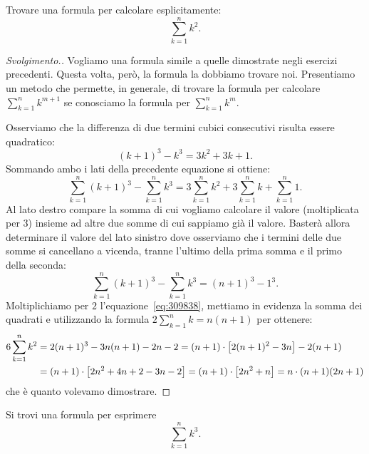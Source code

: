 \begin{exercise}
  Trovare una formula per calcolare esplicitamente:
  \[
    \sum_{k=1}^n k^2.
  \]
\end{exercise}
\begin{proof}[Svolgimento.]
Vogliamo una formula simile a quelle dimostrate negli esercizi 
precedenti. 
Questa volta, però, la formula la dobbiamo trovare noi.
Presentiamo un metodo che permette, in generale, 
di trovare la formula per calcolare $\sum_{k=1}^n k^{m+1}$
se conosciamo la formula per $\sum_{k=1}^n k^m$.

Osserviamo che la differenza 
di due termini cubici consecutivi risulta essere quadratico:
\[
(k+1)^3 - k^3 = 3 k^2 + 3k + 1.  
\]
Sommando ambo i lati della precedente equazione si ottiene:
\begin{equation}\label{eq:309838}
\sum_{k=1}^n (k+1)^3 - \sum_{k=1}^n k^3 
= 3\sum_{k=1}^n k^2+3\sum_{k=1}^n k+\sum_{k=1}^n 1.
\end{equation}
Al lato destro compare la somma di cui vogliamo calcolare il valore 
(moltiplicata per $3$)
insieme ad altre due somme di cui sappiamo già il valore. 
Basterà allora determinare il valore del lato sinistro dove 
osserviamo che i termini delle due somme si cancellano 
a vicenda,
tranne l'ultimo della prima somma 
e il primo della seconda: 
\[
  \sum_{k=1}^n(k+1)^3 - \sum_{k=1}^n k^3 = (n+1)^3 - 1^3.
\]
Moltiplichiamo per $2$ l'equazione~\eqref{eq:309838},
mettiamo in evidenza la somma dei quadrati e 
utilizzando la formula $2\sum_{k=1}^n k = n(n+1)$
per ottenere:
\begin{align*}
  6 \sum_{k=1}^n k^2 
  &=  2(n+1)^3 - 3 n(n+1) - 2n - 2
  = (n+1) \cdot {\left[ 2(n+1)^2 - 3n \right]} - 2(n+1)\\
  &= (n+1)\cdot {\left[ 2n^2+4n+2 -3n - 2 \right]}
   = (n+1)\cdot {\left[ 2n^2+n \right]} 
   = n \cdot (n+1)(2n+1)
\end{align*}
che è quanto volevamo dimostrare.
\end{proof}

\begin{exercise}
  Si trovi una formula per esprimere
  \[
  \sum_{k=1}^n k^3.
  \]
\end{exercise}

